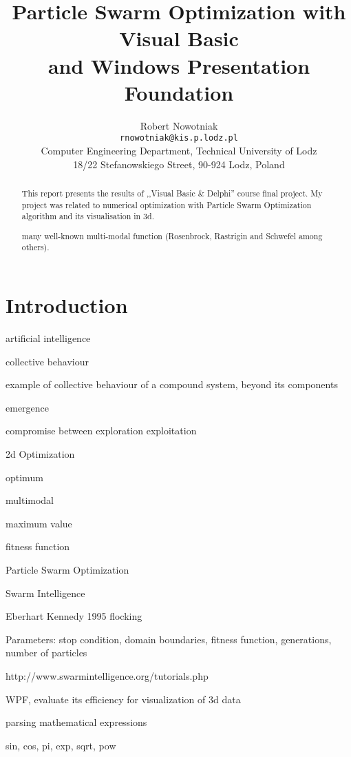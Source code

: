 \documentclass[a4paper,11pt,twocolumn]{article}
\title{Particle Swarm Optimization with Visual Basic\\ and Windows Presentation
Foundation}
\author{Robert Nowotniak\\
\texttt{rnowotniak@kis.p.lodz.pl}\\
Computer Engineering Department, Technical University of Lodz\\
18/22 Stefanowskiego Street, 90-924 Lodz, Poland}
\begin{document}
\maketitle

\thispagestyle{empty} 
\pagestyle{empty} 

\begin{abstract}
This report presents the results of ,,Visual Basic \& Delphi'' course
final project.
My project was related to numerical optimization with Particle Swarm
Optimization algorithm and its visualisation in 3d.

many well-known multi-modal function (Rosenbrock, Rastrigin and Schwefel among
others).
\end{abstract}

\section{Introduction}

artificial intelligence

collective behaviour

example of
collective behaviour of a compound system,
beyond its components

emergence

compromise between
exploration exploitation

2d Optimization 

optimum

multimodal

maximum value

fitness function

Particle Swarm Optimization

Swarm Intelligence

Eberhart Kennedy 1995
flocking

Parameters:
stop condition,
domain boundaries,
fitness function,
generations,
number of particles

http://www.swarmintelligence.org/tutorials.php

WPF, evaluate its efficiency for visualization of 3d data

parsing mathematical expressions

sin, cos, pi, exp, sqrt, pow
\end{document}
